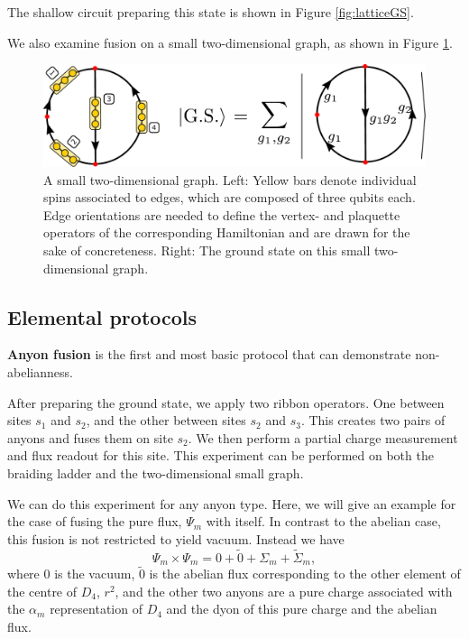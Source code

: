 \documentclass[two column]{article}
\begin{document}
The shallow circuit preparing this state is shown in Figure \ref{fig:latticeGS}.

We also examine fusion on a small two-dimensional graph, as shown in Figure \ref{fig:basketball}.

\begin{figure}
    \centering
    \includegraphics[width=\linewidth]{Figures/basketball.pdf}
    \caption{A small two-dimensional graph. Left: Yellow bars denote individual spins associated to edges, which are composed of three qubits each. Edge orientations are needed to define the vertex- and plaquette operators of the corresponding Hamiltonian and are drawn for the sake of concreteness. Right: The ground state on this small two-dimensional graph.}
    \label{fig:basketball}
\end{figure}




\subsection{Elemental protocols}
\textbf{Anyon fusion}
is the first and most basic protocol that can demonstrate non-abelianness. 

After preparing the ground state, we apply two ribbon operators. One between sites $s_1$ and $s_2$, and the other between sites $s_2$ and $s_3$.
This creates two pairs of anyons and fuses them on site $s_2$. We then perform a partial charge measurement and flux readout for this site.
This experiment can be performed on both the braiding ladder and the two-dimensional small graph.

We can do this experiment for any anyon type. Here, we will give an example for the case of fusing the pure flux, $\Psi_m$ with itself. In contrast to the abelian case, this fusion is not restricted to yield vacuum. Instead we have
$$\Psi_m \times \Psi_m = 0 + \tilde{0} + \Sigma_m + \tilde{\Sigma}_m,$$ where $0$ is the vacuum, $\tilde{0}$ is the abelian flux corresponding to the other element of the centre of $D_4$, $r^2$, and the other two anyons are a pure charge associated with the $\alpha_m$ representation of $D_4$ and the dyon of this pure charge and the abelian flux.
\end{document}
